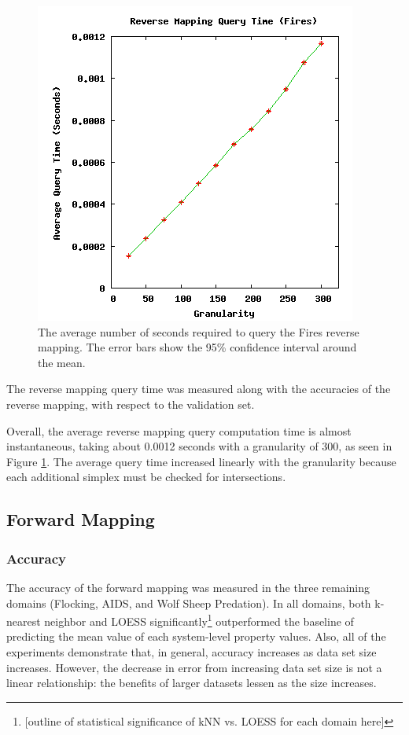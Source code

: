 \begin{figure}[ht]
\centering
\includegraphics[scale=.5]{images/results_fires/rmquery.png}
\caption{The average number of seconds required to query the Fires reverse mapping.
The error bars show the 95\% confidence interval around the mean.}
\label{fig:rmquery}
\end{figure}

The reverse mapping query time was measured along with the accuracies of the reverse mapping, with respect to the validation set.

Overall, the average reverse mapping query computation time is almost instantaneous, taking about 0.0012 seconds with a granularity of 300, as seen in Figure \ref{fig:rmquery}.
The average query time increased linearly with the granularity because each additional simplex must be checked for intersections.


 \subsection{Forward Mapping}

  \subsubsection{Accuracy}

The accuracy of the forward mapping was measured in the three remaining domains (Flocking, AIDS, and Wolf Sheep Predation).
In all domains, both k-nearest neighbor and LOESS significantly\footnote{[outline of statistical significance of kNN vs. LOESS for each domain here]} outperformed the baseline of predicting the mean value of each system-level property values.
Also, all of the experiments demonstrate that, in general, accuracy increases as data set size increases.
However, the decrease in error from increasing data set size is not a linear relationship: the benefits of larger datasets lessen as the size increases.

